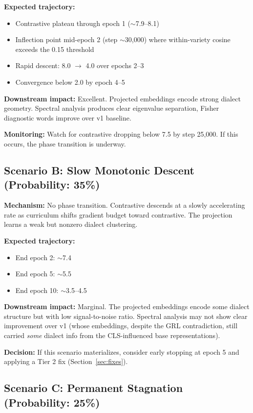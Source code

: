 \documentclass[11pt,a4paper]{article}
\begin{document}
\textbf{Expected trajectory:}
\begin{itemize}[nosep]
  \item Contrastive plateau through epoch 1 ($\sim$7.9--8.1)
  \item Inflection point mid-epoch 2 (step $\sim$30{,}000) where within-variety cosine
        exceeds the 0.15 threshold
  \item Rapid descent: 8.0 $\to$ 4.0 over epochs 2--3
  \item Convergence below 2.0 by epoch 4--5
\end{itemize}

\textbf{Downstream impact:} Excellent. Projected embeddings encode strong dialect
geometry. Spectral analysis produces clear eigenvalue separation, Fisher diagnostic
words improve over v1 baseline.

\textbf{Monitoring:} Watch for contrastive dropping below 7.5 by step 25{,}000.
If this occurs, the phase transition is underway.

\subsection{Scenario B: Slow Monotonic Descent (Probability: 35\%)}

\textbf{Mechanism:} No phase transition. Contrastive descends at a slowly
accelerating rate as curriculum shifts gradient budget toward contrastive. The
projection learns a weak but nonzero dialect clustering.

\textbf{Expected trajectory:}
\begin{itemize}[nosep]
  \item End epoch 2: $\sim$7.4
  \item End epoch 5: $\sim$5.5
  \item End epoch 10: $\sim$3.5--4.5
\end{itemize}

\textbf{Downstream impact:} Marginal. The projected embeddings encode some dialect
structure but with low signal-to-noise ratio. Spectral analysis may not show clear
improvement over v1 (whose embeddings, despite the GRL contradiction, still carried
\emph{some} dialect info from the CLS-influenced base representations).

\textbf{Decision:} If this scenario materializes, consider early stopping at epoch 5
and applying a Tier 2 fix (Section~\ref{sec:fixes}).

\subsection{Scenario C: Permanent Stagnation (Probability: 25\%)}
\end{document}
